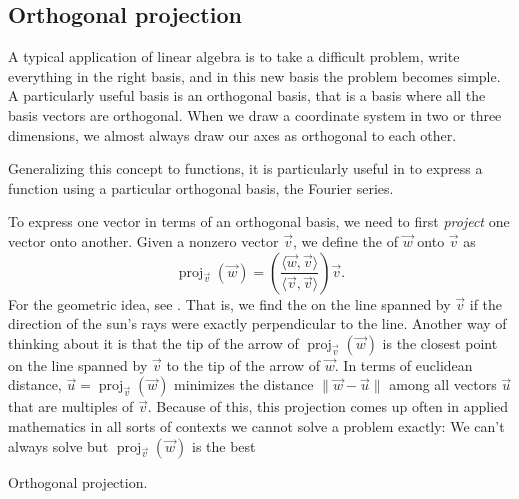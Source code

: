 \subsection{Orthogonal projection}

A typical application of linear algebra is to take a difficult problem,
write everything in the right basis, and in this new basis the problem
becomes simple.  A particularly useful basis is an orthogonal basis, that is
a basis where all the basis vectors are orthogonal.  When we draw a
coordinate system in two or three dimensions, we almost always draw our axes
as orthogonal to each other.

Generalizing this concept to functions,
it is particularly useful in  to express a
function using a particular orthogonal basis, the Fourier series.

To express one vector in terms of an orthogonal basis, we need to first
\emph{project} one vector onto another.
Given a nonzero vector $\vec{v}$, we define the
\emph{}
of $\vec{w}$ onto $\vec{v}$ as
\begin{equation*}
\operatorname{proj}_{\vec{v}}(\vec{w})
=
\left(
\frac{\langle \vec{w} , \vec{v} \rangle}{ \langle \vec{v} , \vec{v} \rangle}
\right)
\vec{v} .
\end{equation*}
For the geometric idea, see .  That is, we
find the  on the line spanned by $\vec{v}$ if the
direction of the sun's rays
were exactly perpendicular to the line. 
Another way of thinking about it is that the tip of the arrow of
$\operatorname{proj}_{\vec{v}}(\vec{w})$ is the closest point on the line
spanned by $\vec{v}$ to the tip of the arrow of $\vec{w}$.
In terms of euclidean distance, 
$\vec{u} = \operatorname{proj}_{\vec{v}}(\vec{w})$ minimizes the
distance
$\lVert \vec{w} - \vec{u} \rVert$ among all vectors $\vec{u}$ that are
multiples of $\vec{v}$.
Because of this, this projection comes up often in applied
mathematics in all sorts of contexts we cannot solve a problem
exactly: We can't always solve
but $\operatorname{proj}_{\vec{v}}(\vec{w})$ is the best 

\begin{myfig}
\capstart
{}
\caption{Orthogonal projection.\label{vec-orthoproj:fig}}
\end{myfig}

